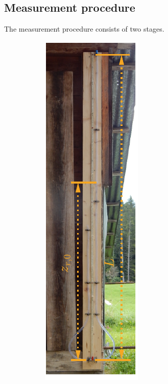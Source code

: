 \documentclass[a4paper,11pt, twocolumn]{article}
\begin{document}
\subsection{Measurement procedure}
The measurement procedure consists of two stages. 
\begin{figure}[h!]
	\centering
	\begin{subfigure}{0.22\textwidth}
		\centering
		\includegraphics[width=\textwidth]{figures/initial.pdf}

\end{subfigure}
\end{figure}
\end{document}
